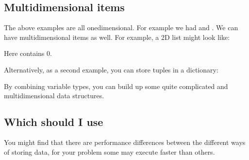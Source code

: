 \documentclass[letterpaper,10pt,british]{sphinxmanual}
\begin{document}
\subsection{Multi\sphinxhyphen{}dimensional items}
\label{\detokenize{chapters/programming_fundamentals/variables:multi-dimensional-items}}
\sphinxAtStartPar
The above examples are all one\sphinxhyphen{}dimensional. For example we had  and . We can have multi\sphinxhyphen{}dimensional items as well. For example, a 2D list might look like:

\begin{sphinxVerbatim}[commandchars=\\\{\}]
  \PYG{p}{[}\PYG{p}{[}  \PYG{p}{]} \PYG{p}{[}  \PYG{p}{]} \PYG{p}{[}  \PYG{p}{]}\PYG{p}{]}
\end{sphinxVerbatim}

\sphinxAtStartPar
Here  contains 0.

\sphinxAtStartPar
Alternatively, as a second example, you can store tuples in a dictionary:

\begin{sphinxVerbatim}[commandchars=\\\{\}]
       
\end{sphinxVerbatim}

\sphinxAtStartPar
By combining variable types, you can build up some quite complicated and multi\sphinxhyphen{}dimensional data structures.


\subsection{Which should I use}
\label{\detokenize{chapters/programming_fundamentals/variables:which-should-i-use}}
\sphinxAtStartPar
You might find that there are performance differences between the different ways of storing data, for your problem some may execute faster than others.
\end{document}
